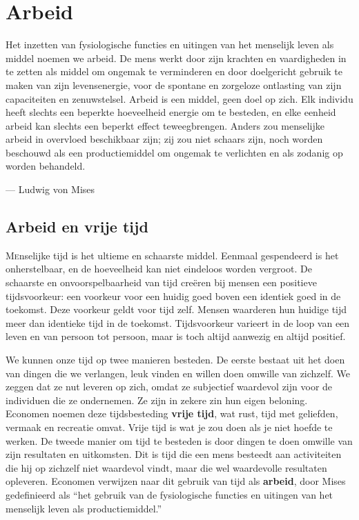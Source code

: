 \chapter{Arbeid}
\begin{blockquotebox}
    Het inzetten van fysiologische functies en uitingen van het menselijk leven als middel noemen we arbeid. De mens werkt door zijn krachten en vaardigheden in te zetten als middel om ongemak te verminderen en door doelgericht gebruik te maken van zijn levensenergie, voor de spontane en zorgeloze  ontlasting van zijn capaciteiten en zenuwstelsel. Arbeid is een middel, geen doel op zich. Elk individu heeft slechts een beperkte hoeveelheid energie om te besteden, en elke eenheid arbeid kan slechts een beperkt effect teweegbrengen. Anders zou menselijke arbeid in overvloed beschikbaar zijn; zij zou niet schaars zijn, noch worden beschouwd als een productiemiddel om ongemak te verlichten en als zodanig op worden behandeld.\footnotemark \par\raggedleft--- Ludwig von Mises
\end{blockquotebox}

\section{Arbeid en vrije tijd}

\lettrine{M}enselijke tijd is het ultieme en schaarste middel. Eenmaal gespendeerd
is het onherstelbaar, en de hoeveelheid kan niet eindeloos worden
vergroot. De schaarste en onvoorspelbaarheid van tijd creëren bij mensen
een positieve tijdsvoorkeur: een voorkeur voor een huidig goed boven een
identiek goed in de toekomst. Deze voorkeur geldt voor tijd zelf. Mensen
waarderen hun huidige tijd meer dan identieke tijd in de toekomst.
Tijdsvoorkeur varieert in de loop van een leven en van persoon tot
persoon, maar is toch altijd aanwezig en altijd positief.

We kunnen onze tijd op twee manieren besteden. De eerste bestaat uit het
doen van dingen die we verlangen, leuk vinden en willen doen omwille van
zichzelf. We zeggen dat ze nut leveren op zich, omdat ze subjectief
waardevol zijn voor de individuen die ze ondernemen. Ze zijn in zekere
zin hun eigen beloning. Economen noemen deze tijdsbesteding
\textbf{vrije tijd}, wat rust, tijd met geliefden, vermaak en recreatie
omvat. Vrije tijd is wat je zou doen als je niet hoefde te werken. De
tweede manier om tijd te besteden is door dingen te doen omwille van
zijn resultaten en uitkomsten. Dit is tijd die een mens besteedt aan
activiteiten die hij op zichzelf niet waardevol vindt, maar die wel
waardevolle resultaten opleveren. Economen verwijzen naar dit gebruik
van tijd als \textbf{arbeid}, door Mises gedefinieerd als ``het gebruik
van de fysiologische functies en uitingen van het menselijk leven als
productiemiddel.''\autocite{38}

